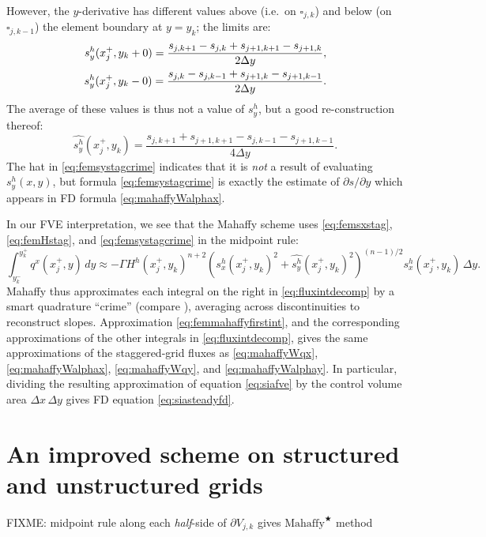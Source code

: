 \documentclass[11pt]{amsart}
\newcommand{\Mstar}{$\text{Mahaffy}^{\bigstar}$\xspace}
\begin{document}
However, the $y$-derivative has different values above (i.e.~on $\square_{j,k}$) and below (on $\square_{j,k-1}$) the element boundary at $y = y_k$; the limits are:
\begin{align}
s^h_y(x_j^+,y_k+0) = \frac{s_{j,k+1}-s_{j,k} + s_{j+1,k+1}-s_{j+1,k}}{2\Delta y}, \\
s^h_y(x_j^+,y_k-0) = \frac{s_{j,k}-s_{j,k-1} + s_{j+1,k}-s_{j+1,k-1}}{2\Delta y}. \notag
\end{align}
The average of these values is thus not a value of $s_y^h$, but a good re-construction thereof:
\begin{equation}
\widehat{s^h_y}(x_j^+,y_k) = \frac{s_{j,k+1} + s_{j+1,k+1} - s_{j,k-1} - s_{j+1,k-1}}{4\Delta y}. \label{eq:femsystagcrime}
\end{equation}
The hat in \eqref{eq:femsystagcrime} indicates that it is \emph{not} a result of evaluating $s^h_y(x,y)$, but formula \eqref{eq:femsystagcrime} is exactly the estimate of $\partial s/\partial y$ which appears in FD formula \eqref{eq:mahaffyWalphax}.

In our FVE interpretation, we see that the Mahaffy scheme uses \eqref{eq:femsxstag}, \eqref{eq:femHstag}, and \eqref{eq:femsystagcrime} in the midpoint rule:
\begin{equation}
\int_{y_k^-}^{y_k^+} q^x(x_j^+,y)\,dy \approx - \Gamma H^h(x_j^+,y_k)^{n+2} \left(s^h_x(x_j^+,y_k)^2 + \widehat{s^h_y}(x_j^+,y_k)^2\right)^{(n-1)/2} s^h_x(x_j^+,y_k)\,\Delta y. \label{eq:femmahaffyfirstint}
\end{equation}
Mahaffy thus approximates each integral on the right in \eqref{eq:fluxintdecomp} by a smart quadrature ``crime'' (compare \cite{Strang1972}), averaging across discontinuities to reconstruct slopes.  Approximation \eqref{eq:femmahaffyfirstint}, and the corresponding approximations of the other integrals in \eqref{eq:fluxintdecomp}, gives the same approximations of the staggered-grid fluxes as \eqref{eq:mahaffyWqx}, \eqref{eq:mahaffyWalphax}, \eqref{eq:mahaffyWqy}, and \eqref{eq:mahaffyWalphay}.  In particular, dividing the resulting approximation of equation \eqref{eq:siafve} by the control volume area $\Delta x\,\Delta y$ gives FD equation \eqref{eq:siasteadyfd}.

\section{An improved scheme on structured and unstructured grids}

FIXME: midpoint rule along each \emph{half}-side of  $\partial V_{j,k}$ gives \Mstar method
\end{document}
